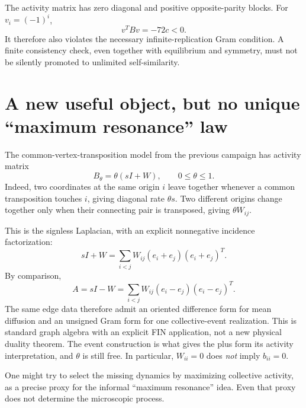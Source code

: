 \documentclass[11pt,a4paper]{article}
\begin{document}
The activity matrix has zero diagonal and positive opposite-parity blocks.
For $v_i=(-1)^i$,
\[
 v^TBv=-72c<0.
\]
It therefore also violates the necessary infinite-replication Gram
condition. A finite consistency check, even together with equilibrium and
symmetry, must not be silently promoted to unlimited self-similarity.

\section{A new useful object, but no unique ``maximum resonance'' law}

The common-vertex-transposition model from the previous campaign has
activity matrix
\[
 B_\theta=\theta(sI+W),\qquad 0\le\theta\le1.
\]
Indeed, two coordinates at the same origin $i$ leave together whenever a
common transposition touches $i$, giving diagonal rate $\theta s$.
Two different origins change together only when their connecting pair is
transposed, giving $\theta W_{ij}$.

This is the signless Laplacian, with an explicit nonnegative incidence
factorization:
\[
 sI+W=\sum_{i<j}W_{ij}(e_i+e_j)(e_i+e_j)^T.
\]
By comparison,
\[
 A=sI-W=\sum_{i<j}W_{ij}(e_i-e_j)(e_i-e_j)^T.
\]
The same edge data therefore admit an oriented difference form for mean
diffusion and an unsigned Gram form for one collective-event realization.
This is standard graph algebra with an explicit FIN application, not a
new physical duality theorem. The event construction is what gives the
plus form its activity interpretation, and $\theta$ is still free.
In particular, $W_{ii}=0$ does \emph{not} imply $b_{ii}=0$.

One might try to select the missing dynamics by maximizing collective
activity, as a precise proxy for the informal ``maximum resonance'' idea.
Even that proxy does not determine the microscopic process.
\end{document}
